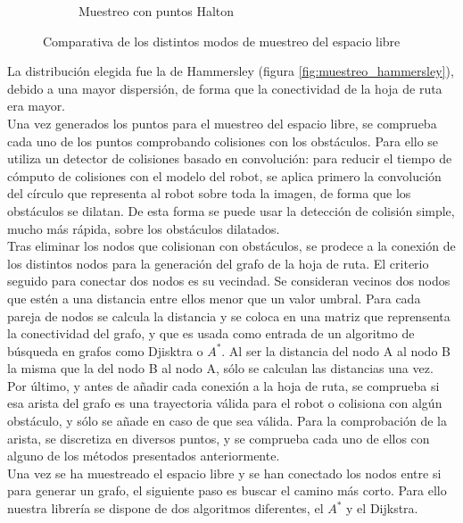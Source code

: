 \begin{figure}[h]
\begin{subfigure}[b]{0.3\textwidth}
                \caption{Muestreo con puntos Halton}
                \label{fig:muestreo_halton}
        \end{subfigure}
        \caption{Comparativa de los distintos modos de muestreo del espacio libre}\label{fig:muestreo}
\end{figure}


La distribución elegida fue la de Hammersley (figura \ref{fig:muestreo_hammersley}), debido a una mayor dispersión, de forma que la conectividad de la hoja de ruta era mayor.\\

Una vez generados los puntos para el muestreo del espacio libre, se comprueba cada uno de los puntos comprobando colisiones con los obstáculos. Para ello se utiliza un detector de colisiones basado en convolución: para reducir el tiempo de cómputo de colisiones con el modelo del robot, se aplica primero la convolución del círculo que representa al robot sobre toda la imagen, de forma que los obstáculos se dilatan. De esta forma se puede usar la detección de colisión simple, mucho más rápida, sobre los obstáculos dilatados.\\

Tras eliminar los nodos que colisionan con obstáculos, se prodece a la conexión de los distintos nodos para la generación del grafo de la hoja de ruta. El criterio seguido para conectar dos nodos es su vecindad. Se consideran vecinos dos nodos que estén a una distancia entre ellos menor que un valor umbral. Para cada pareja de nodos se calcula la distancia y se coloca en una matriz que reprensenta la conectividad del grafo, y que es usada como entrada de un algoritmo de búsqueda en grafos como Djisktra o $A^*$. Al ser la distancia del nodo A al nodo B la misma que la del nodo B al nodo A, sólo se calculan las distancias una vez.\\

Por último, y antes de añadir cada conexión a la hoja de ruta, se comprueba si esa arista del grafo es una trayectoria válida para el robot o colisiona con algún obstáculo, y sólo se añade en caso de que sea válida. Para la comprobación de la arista, se discretiza en diversos puntos, y se comprueba cada uno de ellos con alguno de los métodos presentados anteriormente.\\

Una vez se ha muestreado el espacio libre y se han conectado los nodos entre si para generar un grafo, el siguiente paso es buscar el camino más corto. Para ello nuestra librería  se dispone de dos algoritmos diferentes, el $A^*$ y el Dijkstra.\\

